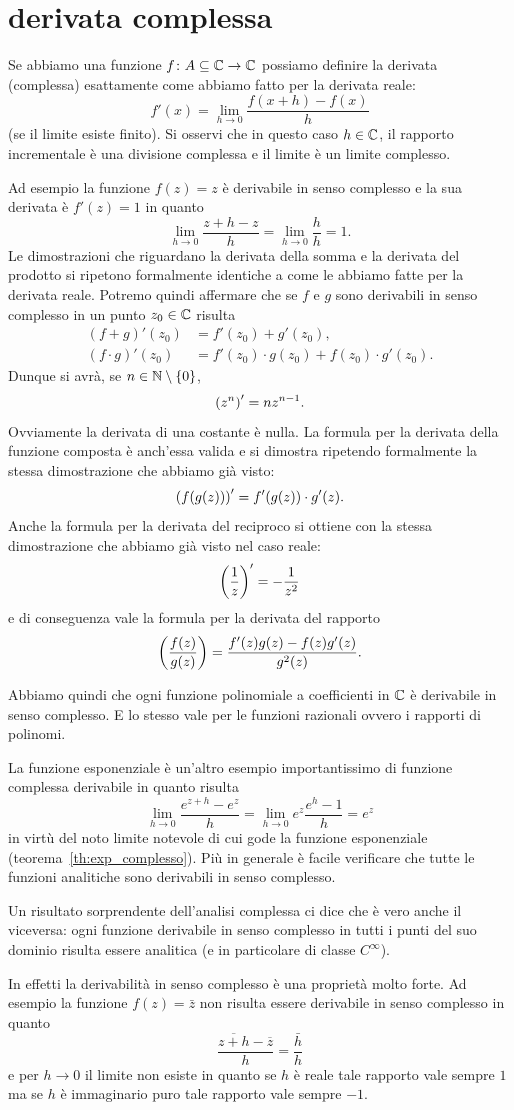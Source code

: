 \section{derivata complessa}
\label{sec:derivata_complessa}

Se abbiamo una funzione $f\colon A\subseteq {\mathbb C} \to {\mathbb C}$
possiamo definire la derivata (complessa) esattamente
come abbiamo fatto per la derivata reale:
\[
  f'(x) = \lim_{h\to 0} \frac{f(x+h)-f(x)}{h}
\]
(se il limite esiste finito).
Si osservi che in questo caso $h\in {\mathbb C}$,
il rapporto incrementale è una divisione complessa
e il limite è un limite complesso.

Ad esempio la funzione $f(z)=z$ è derivabile
in senso complesso e la sua derivata è $f'(z) = 1$
in quanto
\[
  \lim_{h\to 0} \frac{z+h-z}{h} = \lim_{h\to 0} \frac{h}{h}=1.
\]
Le dimostrazioni che riguardano la derivata della somma
e la derivata del prodotto si ripetono formalmente identiche
a come le abbiamo fatte per la derivata reale.
Potremo quindi affermare che se $f$ e $g$ sono derivabili
in senso complesso in un punto $z_0\in {\mathbb C}$ risulta
\begin{align*}
  (f+g)'(z_0) 
    &= f'(z_0) + g'(z_0), \\
  (f\cdot g)'(z_0) 
    &= f'(z_0)\cdot g(z_0) + f(z_0)\cdot g'(z_0).
\end{align*}
Dunque si avrà, se $n\in {\mathbb N}\setminus{\left\{ 0 \right\}}$,
\[
  {\left( z^n \right)}' = n z^{n-1}.
\]
Ovviamente la derivata di una costante è nulla.
La formula per la derivata della funzione composta è anch'essa valida 
e si dimostra ripetendo formalmente la stessa dimostrazione che
abbiamo già visto:
\[
  {\left( f(g(z)) \right)}'  = f'(g(z))\cdot g'(z).
\]
Anche la formula per la derivata del reciproco si ottiene
con la stessa dimostrazione che abbiamo già visto nel caso
reale:
\[
  {\left( \frac 1 z \right)}' = - \frac{1}{z^2}
\]
e di conseguenza vale la formula per la derivata del rapporto
\[
{\left( \frac{f(z)}{g(z)} \right)} = \frac{f'(z)g(z) - f(z) g'(z)}{g^2(z)}.
\]

Abbiamo quindi che ogni funzione polinomiale a coefficienti in ${\mathbb C}$
è derivabile in senso complesso.
E lo stesso vale per le funzioni razionali ovvero i rapporti
di polinomi.

La funzione esponenziale è un'altro esempio importantissimo
di funzione complessa derivabile in quanto risulta
\[
  \lim_{h\to 0} \frac{e^{z+h}-e^z}{h}
  = \lim_{h\to 0} e^z \frac{e^h-1}{h} = e^z
\]
in virtù del noto limite notevole di cui
gode la funzione esponenziale
(teorema~\ref{th:exp_complesso}).
Più in generale è facile verificare che tutte le funzioni
analitiche sono derivabili in senso complesso.

Un risultato sorprendente dell'analisi complessa ci dice
che è vero anche il viceversa: ogni funzione
derivabile in senso complesso in tutti i punti del suo
dominio risulta essere analitica (e in particolare di classe
$C^\infty$).

In effetti la derivabilità in senso complesso è una proprietà
molto forte. Ad esempio la funzione $f(z) = \bar z$
non risulta essere derivabile in senso complesso in quanto
\[
\frac{\overline{z+h}-\overline z}{h} = \frac{\bar h}{h}
\]
e per $h\to 0$ il limite non esiste in quanto se
$h$ è reale tale rapporto vale sempre $1$
ma se $h$ è immaginario puro tale rapporto vale sempre $-1$.
